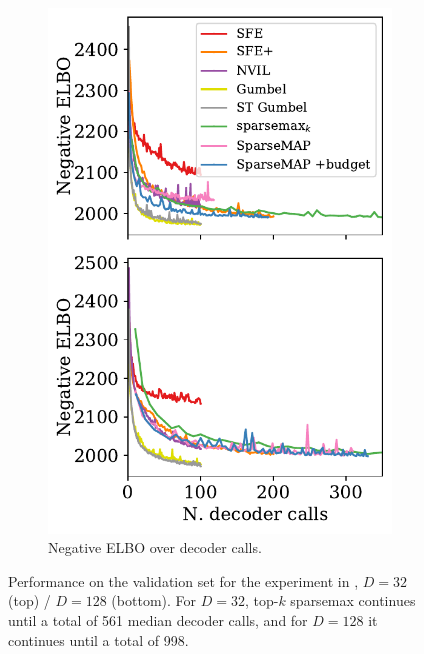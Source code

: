 \begin{figure}[ht]
\begin{subfigure}[b]{0.35\textwidth}
        \includegraphics[width=\textwidth]{Figures/elbo-calls.pdf}
        \caption{Negative ELBO over decoder calls.}
        \label{fig:elbo_bit_calls}
    \end{subfigure}
    \caption{Performance on the validation set
        for the experiment in ,
        $D=32$ (top) / $D=128$ (bottom). For $D=32$, top-$k$ sparsemax continues
        until a total of 561 median decoder calls, and for $D=128$ it continues
        until a total of 998.}
    \label{fig:elbo_bit}
\end{figure}

